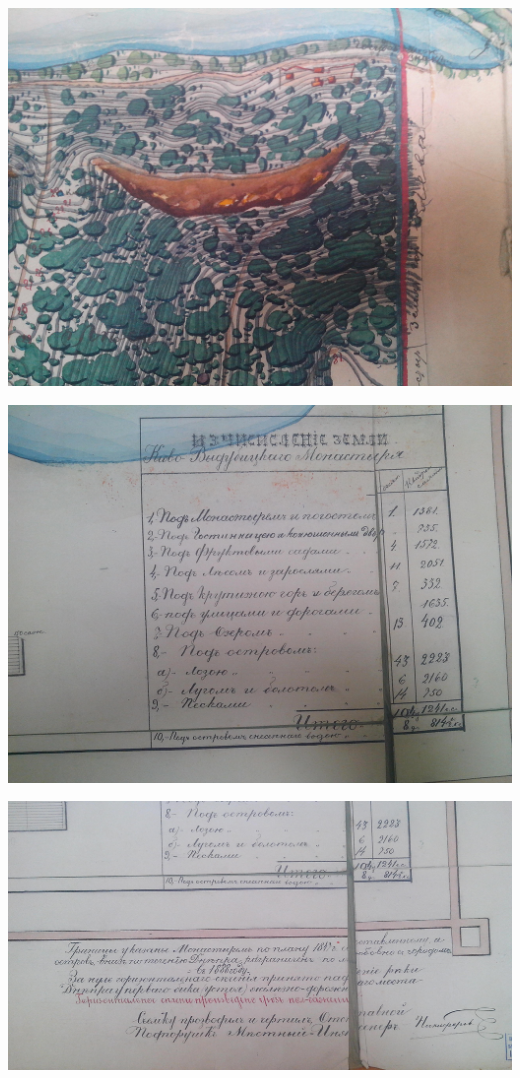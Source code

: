 \begin{center}
\includegraphics[width=\linewidth]{chast-vosp/zver/IMG_20170627_154016.jpg}
\end{center}

\begin{center}
\includegraphics[width=\linewidth]{chast-vosp/zver/IMG_20170627_154027.jpg}
\end{center}

\begin{center}
\includegraphics[width=\linewidth]{chast-vosp/zver/IMG_20170627_154031.jpg}
\end{center}

